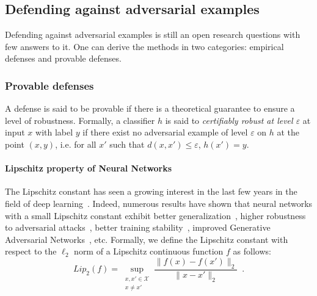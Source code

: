 




\subsection{Defending against adversarial examples}

Defending against adversarial examples is still an open research questions with few answers to it. One can derive the methods in two categories: empirical defenses and provable defenses.

\subsubsection{Provable defenses}
A defense is said to be provable if there is a theoretical guarantee to ensure a level of robustness. Formally, a classifier $h$ is said to \emph{certifiably robust at level $\varepsilon$} at input $x$ with label $y$ if there exist no adversarial example of level $\varepsilon$ on $h$ at the point $(x,y)$, i.e. for all $x'$ such that $d(x,x')\leq\varepsilon$, $h(x') = y$. 

\paragraph{Lipschitz property of Neural Networks} 
The Lipschitz constant has seen a growing interest in the last few years in the field of deep learning~\citep{scaman2018lipschitz,fazlyab2019efficient,combettes2020lipschitz,bethune2021many}.
Indeed, numerous results have shown that neural networks with a small Lipschitz constant exhibit better generalization~\citep{bartlett2017spectrally}, higher robustness to adversarial attacks~\citep{szegedy2014intriguing,farnia2018generalizable,tsuzuku2018lipschitz}, better training stability~\citep{xiao2018dynamical,trockman2021orthogonalizing}, improved Generative Adversarial Networks~\citep{arjovsky2017wasserstein}, etc.
Formally, we define the Lipschitz constant with respect to the $\ell_2$ norm of a Lipschitz continuous function $f$ as follows:
\begin{equation*}
  Lip_{2}{(f)} = \sup_{\substack{x, x' \in \mathcal{X} \\ x \neq x'}} \frac{\lVert f(x) - f(x') \rVert_2}{\lVert x - x' \rVert_2} \enspace.
\end{equation*}

